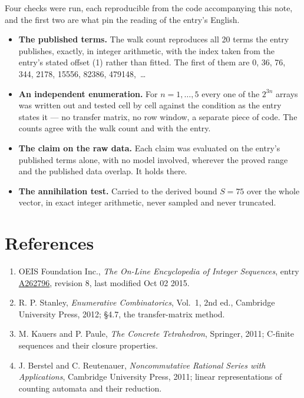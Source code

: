 \documentclass[11pt]{article}
\theoremstyle{definition}
\begin{document}
Four checks were run, each reproducible from the code accompanying this note, and the first two are what pin the reading of the entry's English.

\begin{itemize}

\item {\bfseries The published terms.} The walk count reproduces all 20 terms the entry publishes, exactly, in integer arithmetic, with the index taken from the entry's stated offset (1) rather than fitted. The first of them are 0, 36, 76, 344, 2178, 15556, 82386, 479148,~\dots

\item {\bfseries An independent enumeration.} For $n = 1,\dots,5$ every one of the $2^{3n}$ arrays was written out and tested cell by cell against the condition as the entry states it --- no transfer matrix, no row window, a separate piece of code. The counts agree with the walk count and with the entry.

\item {\bfseries The claim on the raw data.} Each claim was evaluated on the entry's published terms alone, with no model involved, wherever the proved range and the published data overlap. It holds there.

\item {\bfseries The annihilation test.} Carried to the derived bound $S = 75$ over the whole vector, in exact integer arithmetic, never sampled and never truncated.

\end{itemize}

\section{References}

\begin{enumerate}

\item OEIS Foundation Inc., \emph{The On-Line Encyclopedia of Integer Sequences}, entry \href{https://oeis.org/A262796}{A262796}, revision 8, last modified Oct 02 2015.

\item R. P. Stanley, \emph{Enumerative Combinatorics}, Vol.~1, 2nd ed., Cambridge University Press, 2012; \S4.7, the transfer-matrix method.

\item M. Kauers and P. Paule, \emph{The Concrete Tetrahedron}, Springer, 2011; C-finite sequences and their closure properties.

\item J. Berstel and C. Reutenauer, \emph{Noncommutative Rational Series with Applications}, Cambridge University Press, 2011; linear representations of counting automata and their reduction.

\end{enumerate}
\end{document}
